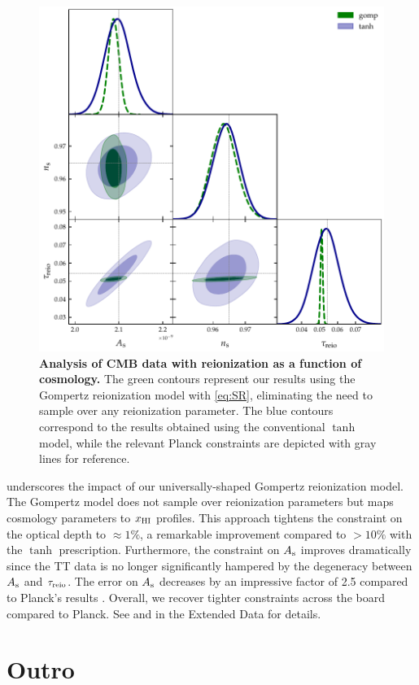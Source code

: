 \begin{figure}[tb]
\centering
\includegraphics[width=0.6\linewidth]{figs/gomp_tanh_triangle_kill.pdf}
\caption{\textbf{Analysis of CMB data with reionization as a function of
cosmology.}
The green contours represent our results using the Gompertz reionization
model with \cref{eq:SR}, eliminating the need to sample over any
reionization parameter.
The blue contours correspond to the results obtained using the
conventional $\tanh$ model, while the relevant Planck constraints
\cite{Planck2020a} are depicted with gray lines for reference.}
\label{fig:kill}
\end{figure}

 underscores the impact of our universally-shaped
Gompertz reionization model.
The Gompertz model does not sample over reionization parameters but
maps cosmology parameters to $x_{\mathrm{HI}}$ profiles.
This approach tightens the constraint on the optical depth to $\approx
1\%$, a remarkable improvement compared to $> 10\%$ with the $\tanh$
prescription.
Furthermore, the constraint on $A_\mathrm{s}$ improves dramatically since the TT
data is no longer significantly hampered by the degeneracy between $A_\mathrm{s}$
and $\tau_{\mathrm{reio}}$.
The error on $A_\mathrm{s}$ decreases by an impressive factor of 2.5 compared to
Planck's results \cite{Planck2020a}.
Overall, we recover tighter constraints across the board compared to
Planck.
See  and  in the Extended Data for details.


\section*{Outro}

